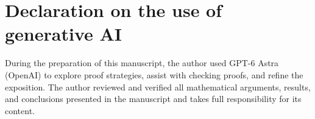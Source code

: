\documentclass[11pt,a4paper]{article}
\numberwithin{equation}{section}
\theoremstyle{definition}
\theoremstyle{plain}
\begin{document}

\section*{Declaration on the use of generative AI}
During the preparation of this manuscript, the author used GPT-6 Astra
(OpenAI) to explore proof strategies, assist with checking proofs, and
refine the exposition. The author reviewed and verified all mathematical
arguments, results, and conclusions presented in the manuscript and
takes full responsibility for its content.
\end{document}
